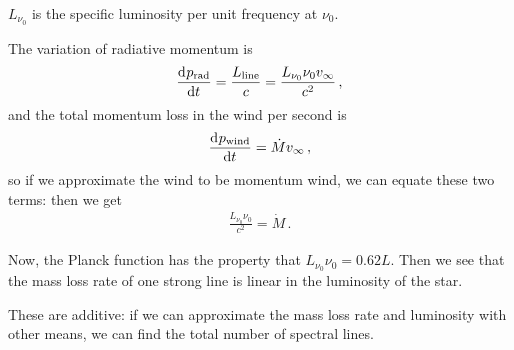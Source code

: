 \documentclass[main.tex]{subfiles}
\begin{document}
\(L_{\nu_0 }\) is the specific luminosity per unit frequency at \(\nu_0 \).

The variation of radiative momentum is 
%
\begin{align}
  \dv[]{p _{\text{rad}}}{t} = \frac{L _{\text{line}}}{c}
  = \frac{L_{\nu_0 } \nu_0 v_{\infty}}{c^2}
\,,
\end{align}
%
and the total momentum loss in the wind per second is 
%
\begin{align}
  \dv[]{p _{\text{wind}}}{t} = \dot{M} v_{\infty} 
\,,
\end{align}
%
so if we approximate the wind to be momentum wind, we can equate these two terms: then we get 
%
\begin{align}
  \frac{L_{\nu_0 } \nu_0}{c^2} = \dot{M} 
\,.
\end{align}

Now, the Planck function has the property that \(L_{\nu_0  } \nu_0 = 0.62 L\).
Then we see that the mass loss rate of one strong line is linear in the luminosity of the star.

These are additive: if we can approximate the mass loss rate and luminosity with other means, we can find the total number of spectral lines.
\end{document}
